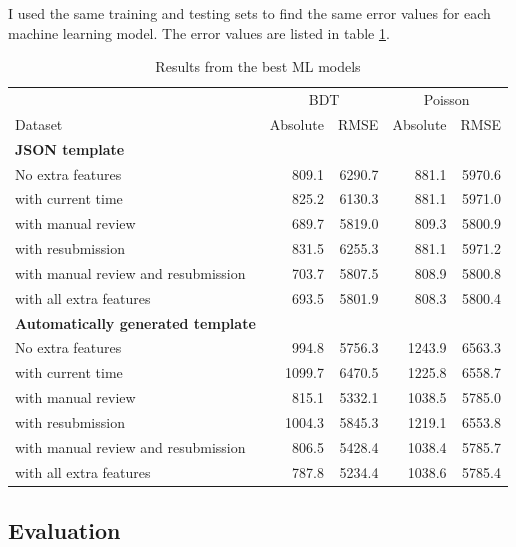 I used the same training and testing sets to find the same error values for each machine learning model.
The error values are listed in table \ref{tab:mlresults}.

\begin{table}[htb]
\begin{center}
\begin{tabularx}{\linewidth}{| X | r | r | r | r |}
\hline
~ & \multicolumn{2}{c|}{BDT} & \multicolumn{2}{c|}{Poisson} \\
Dataset & Absolute & RMSE & Absolute & RMSE \\
\hline
\textbf{JSON template} &  &  &  &  \\
No extra features                   & 809.1 & 6290.7 & 881.1 & 5970.6 \\
with current time                   & 825.2 & 6130.3 & 881.1 & 5971.0 \\
with manual review                  & 689.7 & 5819.0 & 809.3 & 5800.9 \\
with resubmission                   & 831.5 & 6255.3 & 881.1 & 5971.2 \\
with manual review and resubmission & 703.7 & 5807.5 & 808.9 & 5800.8 \\
with all extra features             & 693.5 & 5801.9 & 808.3 & 5800.4 \\
\hline
\textbf{Automatically generated template} &  &  &  &  \\
No extra features                   & 994.8 & 5756.3 & 1243.9 & 6563.3 \\
with current time                   & 1099.7 & 6470.5 & 1225.8 & 6558.7 \\
with manual review                  & 815.1 & 5332.1 & 1038.5 & 5785.0 \\
with resubmission                   & 1004.3 & 5845.3 & 1219.1 & 6553.8 \\
with manual review and resubmission & 806.5 & 5428.4 & 1038.4 & 5785.7 \\
with all extra features             & 787.8 & 5234.4 & 1038.6 & 5785.4 \\
\hline
\end{tabularx}
\end{center}
\caption{Results from the best ML models}
\label{tab:mlresults}
\end{table}


\subsection{Evaluation}
\label{sec:evaluation}

